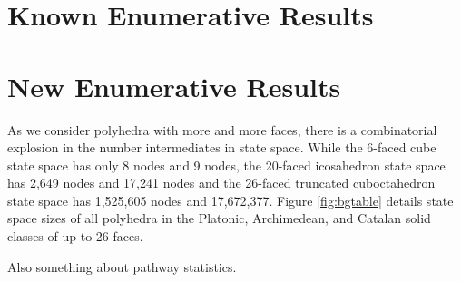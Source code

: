 \section{Known Enumerative Results}
\section{New Enumerative Results}

As we consider polyhedra with more and more faces, there is a combinatorial explosion in the number intermediates in state space. While the 6-faced cube state space has only 8 nodes and 9 nodes, the 20-faced icosahedron state space has 2,649 nodes and 17,241 nodes and the 26-faced truncated cuboctahedron state space has 1,525,605 nodes and 17,672,377. Figure \ref{fig:bgtable} details state space sizes of all polyhedra in the Platonic, Archimedean, and Catalan solid classes of up to 26 faces. 


Also something about pathway statistics. 


